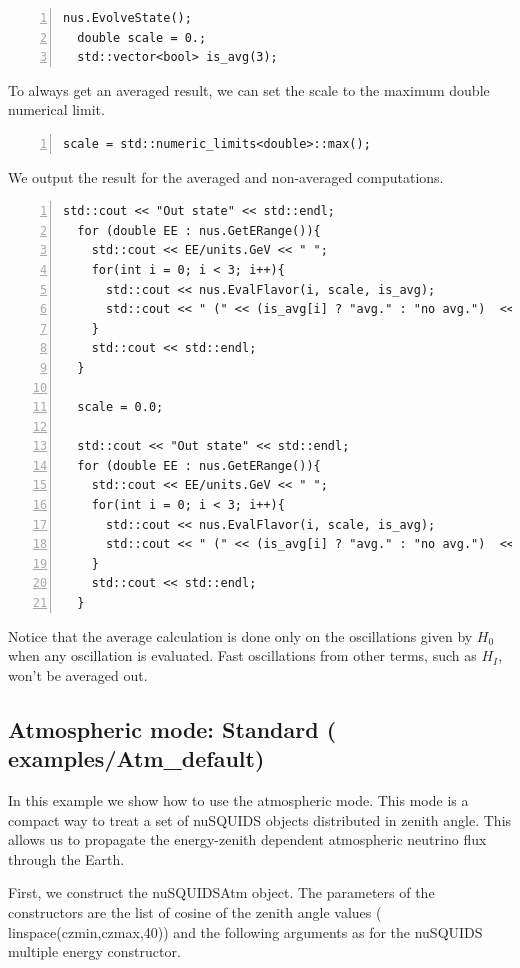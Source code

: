 \documentclass[3p,12pt]{elsarticle}
\newcommand{\ttf}{\ttfamily}
\begin{document}
\begin{lstlisting}[frame=leftline, numbers =
  left,breaklines=true,label = ex:sin1]
  nus.EvolveState();
  double scale = 0.;
  std::vector<bool> is_avg(3);
\end{lstlisting}

To always get an averaged result, we can set the scale to the maximum
double numerical limit.

\begin{lstlisting}[frame=leftline, numbers =
  left,breaklines=true,label = ex:sin1]
  scale = std::numeric_limits<double>::max();
\end{lstlisting}

We output the result for the averaged and non-averaged computations.

\begin{lstlisting}[frame=leftline, numbers =
  left,breaklines=true,label = ex:sin1]
    std::cout << "Out state" << std::endl;
  for (double EE : nus.GetERange()){
    std::cout << EE/units.GeV << " ";
    for(int i = 0; i < 3; i++){
      std::cout << nus.EvalFlavor(i, scale, is_avg);
      std::cout << " (" << (is_avg[i] ? "avg." : "no avg.")  << ") ";
    }
    std::cout << std::endl;
  }

  scale = 0.0;

  std::cout << "Out state" << std::endl;
  for (double EE : nus.GetERange()){
    std::cout << EE/units.GeV << " ";
    for(int i = 0; i < 3; i++){
      std::cout << nus.EvalFlavor(i, scale, is_avg);
      std::cout << " (" << (is_avg[i] ? "avg." : "no avg.")  << ") ";
    }
    std::cout << std::endl;
  }
\end{lstlisting}

Notice that the average calculation is done only on the
oscillations given by $H_0$ when any oscillation is evaluated. Fast
oscillations from other terms, such as $H_I$, won't be
averaged out.


\subsection{Atmospheric mode: Standard \textnormal{({\ttf
      examples/Atm\_default})}}
\label{sec:atmexample}
In this example we show how to use the atmospheric mode. This mode is
a compact way to treat a set of {\ttf nuSQUIDS} objects distributed in
zenith angle.
This allows us to propagate the energy-zenith dependent atmospheric
neutrino flux through the Earth.

First, we construct the {\ttf nuSQUIDSAtm} object. The parameters of the
constructors are the list of cosine of the zenith angle values ({\ttf
  linspace(czmin,czmax,40)}) and the following arguments as for the {\ttf nuSQUIDS}
multiple energy constructor.
\end{document}
